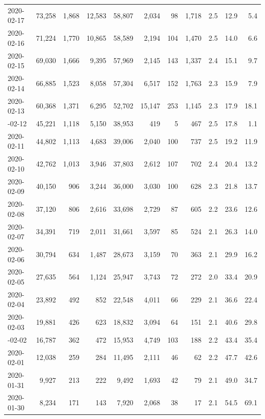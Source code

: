 \documentclass[12pt, a4paper,oneside]{book}
\theoremstyle{definition}
\begin{document}
\begin{longtable}{lrrrrrrrrrr}
	\addlinespace
	\rowcolor{gray!6}  2020-02-17 & 73,258 & 1,868 & 12,583 & 58,807 & 2,034 & 98 & 1,718 & 2.5 & 12.9 & 5.4\\
	2020-02-16 & 71,224 & 1,770 & 10,865 & 58,589 & 2,194 & 104 & 1,470 & 2.5 & 14.0 & 6.6\\
	\rowcolor{gray!6}  2020-02-15 & 69,030 & 1,666 & 9,395 & 57,969 & 2,145 & 143 & 1,337 & 2.4 & 15.1 & 9.7\\
	2020-02-14 & 66,885 & 1,523 & 8,058 & 57,304 & 6,517 & 152 & 1,763 & 2.3 & 15.9 & 7.9\\
	\rowcolor{gray!6}  2020-02-13 & 60,368 & 1,371 & 6,295 & 52,702 & 15,147 & 253 & 1,145 & 2.3 & 17.9 & 18.1\\
	\addlinespace
	2020-02-12 & 45,221 & 1,118 & 5,150 & 38,953 & 419 & 5 & 467 & 2.5 & 17.8 & 1.1\\
	\rowcolor{gray!6}  2020-02-11 & 44,802 & 1,113 & 4,683 & 39,006 & 2,040 & 100 & 737 & 2.5 & 19.2 & 11.9\\
	2020-02-10 & 42,762 & 1,013 & 3,946 & 37,803 & 2,612 & 107 & 702 & 2.4 & 20.4 & 13.2\\
	\rowcolor{gray!6}  2020-02-09 & 40,150 & 906 & 3,244 & 36,000 & 3,030 & 100 & 628 & 2.3 & 21.8 & 13.7\\
	2020-02-08 & 37,120 & 806 & 2,616 & 33,698 & 2,729 & 87 & 605 & 2.2 & 23.6 & 12.6\\
	\addlinespace
	\rowcolor{gray!6}  2020-02-07 & 34,391 & 719 & 2,011 & 31,661 & 3,597 & 85 & 524 & 2.1 & 26.3 & 14.0\\
	2020-02-06 & 30,794 & 634 & 1,487 & 28,673 & 3,159 & 70 & 363 & 2.1 & 29.9 & 16.2\\
	\rowcolor{gray!6}  2020-02-05 & 27,635 & 564 & 1,124 & 25,947 & 3,743 & 72 & 272 & 2.0 & 33.4 & 20.9\\
	2020-02-04 & 23,892 & 492 & 852 & 22,548 & 4,011 & 66 & 229 & 2.1 & 36.6 & 22.4\\
	\rowcolor{gray!6}  2020-02-03 & 19,881 & 426 & 623 & 18,832 & 3,094 & 64 & 151 & 2.1 & 40.6 & 29.8\\
	\addlinespace
	2020-02-02 & 16,787 & 362 & 472 & 15,953 & 4,749 & 103 & 188 & 2.2 & 43.4 & 35.4\\
	\rowcolor{gray!6}  2020-02-01 & 12,038 & 259 & 284 & 11,495 & 2,111 & 46 & 62 & 2.2 & 47.7 & 42.6\\
	2020-01-31 & 9,927 & 213 & 222 & 9,492 & 1,693 & 42 & 79 & 2.1 & 49.0 & 34.7\\
	\rowcolor{gray!6}  2020-01-30 & 8,234 & 171 & 143 & 7,920 & 2,068 & 38 & 17 & 2.1 & 54.5 & 69.1\\

\end{longtable}
\end{document}
